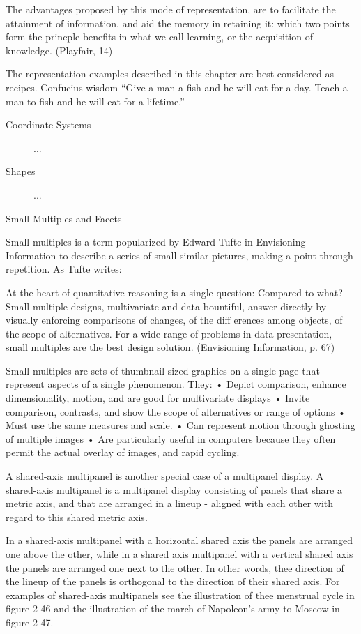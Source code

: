 The advantages proposed by this mode of representation, are to facilitate the attainment of information, and aid the memory in retaining it: which two points form the princple benefits in what we call learning, or the acquisition of knowledge. (Playfair, 14)

The representation examples described in this chapter are best considered as recipes. Confucius wisdom “Give a man a fish and he will eat for a day. Teach a man to fish and he will eat for a lifetime.”

\begin{description}
	\item[Coordinate Systems] ...
	\item[Shapes] ...
\end{description}

Small Multiples and Facets

Small multiples is a term popularized by Edward Tufte in Envisioning Information to describe a series of small similar pictures, making a point through repetition. As Tufte writes:

At the heart of quantitative reasoning is a single question: Compared to what? Small multiple designs, multivariate and data bountiful, answer directly by visually enforcing comparisons of changes, of the diff erences among objects, of the scope of alternatives. For a wide range of problems in data presentation, small multiples are the best design solution.
(Envisioning Information, p. 67)

Small multiples are sets of thumbnail sized graphics on a single page that represent aspects of a single
phenomenon. They:
• Depict comparison, enhance dimensionality, motion, and are good for multivariate displays
• Invite comparison, contrasts, and show the scope of alternatives or range of options
• Must use the same measures and scale.
• Can represent motion through ghosting of multiple images
• Are particularly useful in computers because they often permit the actual overlay of images, and
rapid cycling.

A shared-axis multipanel is another special case of a multipanel display. A shared-axis multipanel is a multipanel display consisting of panels that share a metric axis, and that are arranged in a lineup - aligned with each other with regard to this shared metric axis.

In a shared-axis multipanel with a horizontal shared axis the panels are arranged one above the other, while in a shared axis multipanel with a vertical shared axis the panels are arranged one next to the other. In other words, thee direction of the lineup of the panels is orthogonal to the direction of their shared axis. For examples of shared-axis multipanels see the illustration of thee menstrual cycle in figure 2-46 and the illustration of the march of Napoleon’s army to Moscow in figure 2-47.